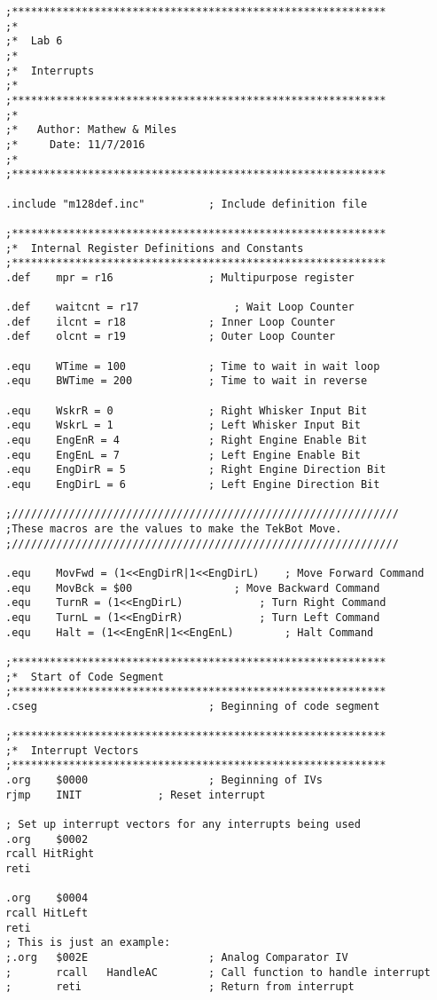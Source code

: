 \documentclass[12pt,letterpaper]{article}
\begin{document}
\begin{verbatim}
;***********************************************************
;*
;*	Lab 6
;*
;*	Interrupts
;*
;***********************************************************
;*
;*	 Author: Mathew & Miles
;*	   Date: 11/7/2016
;*
;***********************************************************

.include "m128def.inc"			; Include definition file

;***********************************************************
;*	Internal Register Definitions and Constants
;***********************************************************
.def	mpr = r16				; Multipurpose register 

.def	waitcnt = r17				; Wait Loop Counter
.def	ilcnt = r18				; Inner Loop Counter
.def	olcnt = r19				; Outer Loop Counter

.equ	WTime = 100				; Time to wait in wait loop
.equ	BWTime = 200			; Time to wait in reverse

.equ	WskrR = 0				; Right Whisker Input Bit
.equ	WskrL = 1				; Left Whisker Input Bit
.equ	EngEnR = 4				; Right Engine Enable Bit
.equ	EngEnL = 7				; Left Engine Enable Bit
.equ	EngDirR = 5				; Right Engine Direction Bit
.equ	EngDirL = 6				; Left Engine Direction Bit

;/////////////////////////////////////////////////////////////
;These macros are the values to make the TekBot Move.
;/////////////////////////////////////////////////////////////

.equ	MovFwd = (1<<EngDirR|1<<EngDirL)	; Move Forward Command
.equ	MovBck = $00				; Move Backward Command
.equ	TurnR = (1<<EngDirL)			; Turn Right Command
.equ	TurnL = (1<<EngDirR)			; Turn Left Command
.equ	Halt = (1<<EngEnR|1<<EngEnL)		; Halt Command

;***********************************************************
;*	Start of Code Segment
;***********************************************************
.cseg							; Beginning of code segment

;***********************************************************
;*	Interrupt Vectors
;***********************************************************
.org	$0000					; Beginning of IVs
rjmp 	INIT			; Reset interrupt

; Set up interrupt vectors for any interrupts being used
.org	$0002
rcall HitRight
reti

.org	$0004
rcall HitLeft
reti
; This is just an example:
;.org	$002E					; Analog Comparator IV
;		rcall	HandleAC		; Call function to handle interrupt
;		reti					; Return from interrupt


\end{verbatim}
\end{document}
